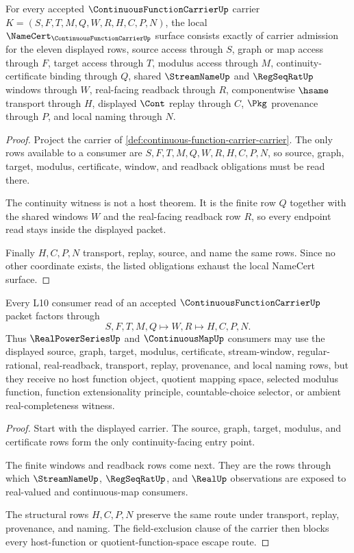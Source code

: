 \begin{theorem}\label{thm:continuous-function-carrier-namecert-obligations}
For every accepted $\ContinuousFunctionCarrierUp$ carrier $K=(S,F,T,M,Q,W,R,H,C,P,N)$, the local $\NameCert_{\ContinuousFunctionCarrierUp}$ surface consists exactly of carrier admission for the eleven displayed rows, source access through $S$, graph or map access through $F$, target access through $T$, modulus access through $M$, continuity-certificate binding through $Q$, shared $\StreamNameUp$ and $\RegSeqRatUp$ windows through $W$, real-facing readback through $R$, componentwise $\hsame$ transport through $H$, displayed $\Cont$ replay through $C$, $\Pkg$ provenance through $P$, and local naming through $N$.
\end{theorem}
\begin{proof}
Project the carrier of \autoref{def:continuous-function-carrier-carrier}. The only rows available to a consumer are $S,F,T,M,Q,W,R,H,C,P,N$, so source, graph, target, modulus, certificate, window, and readback obligations must be read there.

The continuity witness is not a host theorem. It is the finite row $Q$ together with the shared windows $W$ and the real-facing readback row $R$, so every endpoint read stays inside the displayed packet.

Finally $H,C,P,N$ transport, replay, source, and name the same rows. Since no other coordinate exists, the listed obligations exhaust the local NameCert surface.
\end{proof}

\begin{theorem}\label{thm:continuous-function-carrier-l10-readback}
Every L10 consumer read of an accepted $\ContinuousFunctionCarrierUp$ packet factors through
$$
S,F,T,M,Q \longmapsto W,R \longmapsto H,C,P,N .
$$
Thus $\RealPowerSeriesUp$ and $\ContinuousMapUp$ consumers may use the displayed source, graph, target, modulus, certificate, stream-window, regular-rational, real-readback, transport, replay, provenance, and local naming rows, but they receive no host function object, quotient mapping space, selected modulus function, function extensionality principle, countable-choice selector, or ambient real-completeness witness.
\end{theorem}
\begin{proof}
Start with the displayed carrier. The source, graph, target, modulus, and certificate rows form the only continuity-facing entry point.

The finite windows and readback rows come next. They are the rows through which $\StreamNameUp$, $\RegSeqRatUp$, and $\RealUp$ observations are exposed to real-valued and continuous-map consumers.

The structural rows $H,C,P,N$ preserve the same route under transport, replay, provenance, and naming. The field-exclusion clause of the carrier then blocks every host-function or quotient-function-space escape route.
\end{proof}

